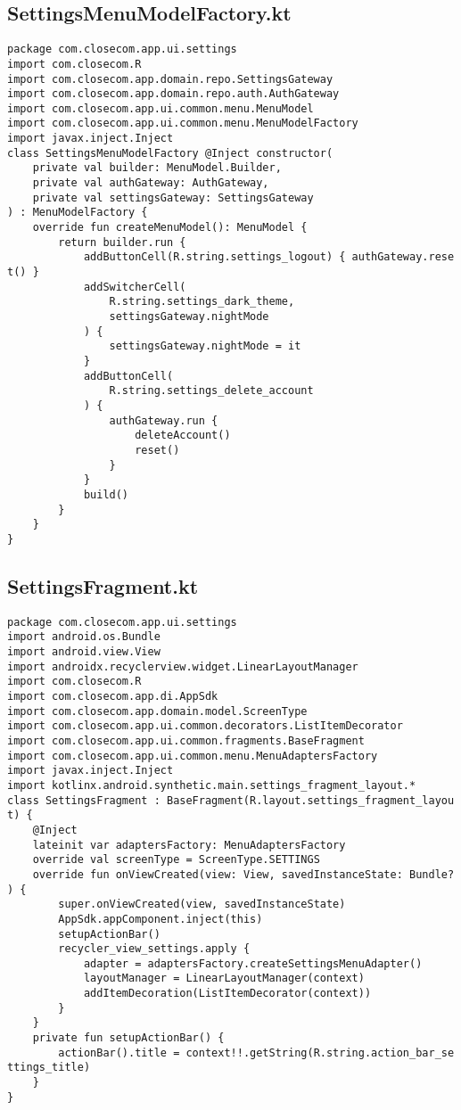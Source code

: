 \documentclass[listing]{espd}
\begin{document}
\subsection{SettingsMenuModelFactory.kt}
\begin{verbatim}
package com.closecom.app.ui.settings
import com.closecom.R
import com.closecom.app.domain.repo.SettingsGateway
import com.closecom.app.domain.repo.auth.AuthGateway
import com.closecom.app.ui.common.menu.MenuModel
import com.closecom.app.ui.common.menu.MenuModelFactory
import javax.inject.Inject
class SettingsMenuModelFactory @Inject constructor(
    private val builder: MenuModel.Builder,
    private val authGateway: AuthGateway,
    private val settingsGateway: SettingsGateway
) : MenuModelFactory {
    override fun createMenuModel(): MenuModel {
        return builder.run {
            addButtonCell(R.string.settings_logout) { authGateway.rese
t() }
            addSwitcherCell(
                R.string.settings_dark_theme,
                settingsGateway.nightMode
            ) {
                settingsGateway.nightMode = it
            }
            addButtonCell(
                R.string.settings_delete_account
            ) {
                authGateway.run {
                    deleteAccount()
                    reset()
                }
            }
            build()
        }
    }
}
\end{verbatim}

\subsection{SettingsFragment.kt}
\begin{verbatim}
package com.closecom.app.ui.settings
import android.os.Bundle
import android.view.View
import androidx.recyclerview.widget.LinearLayoutManager
import com.closecom.R
import com.closecom.app.di.AppSdk
import com.closecom.app.domain.model.ScreenType
import com.closecom.app.ui.common.decorators.ListItemDecorator
import com.closecom.app.ui.common.fragments.BaseFragment
import com.closecom.app.ui.common.menu.MenuAdaptersFactory
import javax.inject.Inject
import kotlinx.android.synthetic.main.settings_fragment_layout.*
class SettingsFragment : BaseFragment(R.layout.settings_fragment_layou
t) {
    @Inject
    lateinit var adaptersFactory: MenuAdaptersFactory
    override val screenType = ScreenType.SETTINGS
    override fun onViewCreated(view: View, savedInstanceState: Bundle?
) {
        super.onViewCreated(view, savedInstanceState)
        AppSdk.appComponent.inject(this)
        setupActionBar()
        recycler_view_settings.apply {
            adapter = adaptersFactory.createSettingsMenuAdapter()
            layoutManager = LinearLayoutManager(context)
            addItemDecoration(ListItemDecorator(context))
        }
    }
    private fun setupActionBar() {
        actionBar().title = context!!.getString(R.string.action_bar_se
ttings_title)
    }
}
\end{verbatim}
\end{document}
